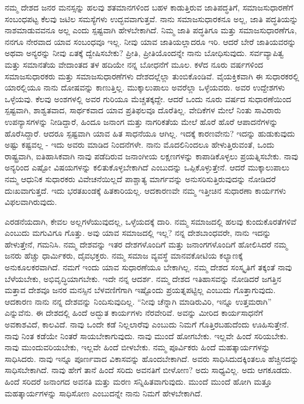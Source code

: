 ನಮ್ಮ ದೇಶದ ಜನರ ಮನಸ್ಸನ್ನು ಹಲವು ಶತಮಾನಗಳಿಂದ ಬಹಳ ಕಾಡುತ್ತಿರುವ ಜಾತಿಪದ್ಧತಿಗೆ, ಸಮಾಜಸುಧಾರಣೆಗೆ ಸಂಬಂಧಪಟ್ಟ ಕೆಲವು ಜಟಿಲ ಸಮಸ್ಯೆಗಳು ಉದ್ಭವವಾಗುತ್ತವೆ. ನಾನು ಸಮಾಜಸುಧಾರಕನೂ ಅಲ್ಲ, ಜಾತಿ ಪದ್ಧತಿಯನ್ನು ನಾಶಮಾಡುವವನೂ ಅಲ್ಲ ಎಂದು ಸ್ಪಷ್ಟವಾಗಿ ಹೇಳಬೇಕಾಗಿದೆ. ನಿಮ್ಮ ಜಾತಿ ಪದ್ಧತಿಗೂ ಮತ್ತು ಸಮಾಜಸುಧಾರಣೆಗೂ, ನನಗೂ ನೇರವಾದ ಯಾವ ಸಂಬಂಧವೂ ಇಲ್ಲ. ನೀವು ಯಾವ ಜಾತಿಯಲ್ಲಾದರೂ ಇರಿ. ಆದರೆ ಬೇರೆ ಜಾತಿಯವರನ್ನು ಅಥವಾ ಅನ್ಯರನ್ನು ನೀವು ಏತಕ್ಕೆ ದ್ವೇಷಿಸಬೇಕು? ಪ್ರೀತಿ, ಪ್ರೀತಿಯೊಂದನ್ನೇ ನಾನು ಬೋಧಿಸುವುದು. ಸರ್ವವ್ಯಾಪಿತ್ವ ಮತ್ತು ಸಮಾನತೆಯ ವೇದಾಂತದ ತಳ ಹದಿಯೇ ನನ್ನ ಬೋಧನೆಗೆ ಮೂಲ. ಕಳೆದ ನೂರು ವರ್ಷಗಳಿಂದ ಸಮಾಜಸುಧಾರಕರು ಮತ್ತು ಸಮಾಜಸುಧಾರಣೆಗಳು ದೇಶದಲ್ಲೆಲ್ಲಾ ತುಂಬಿಕೊಂಡಿವೆ. ವೈಯಕ್ತಿಕವಾಗಿ ಈ ಸುಧಾರಕರಲ್ಲಿ ಯಾರಲ್ಲಿಯೂ ನಾನು ದೋಷವನ್ನು ಕಾಣುತ್ತಿಲ್ಲ. ಮುಕ್ಕಾಲುಪಾಲು ಅವರೆಲ್ಲಾ ಒಳ್ಳೆಯವರು. ಅವರ ಉದ್ದೇಶಗಳು ಒಳ್ಳೆಯವು. ಕೆಲವು ಅಂಶಗಳಲ್ಲಿ ಅವರ ಗುರಿಯೂ ಮೆಚ್ಚತಕ್ಕದ್ದೇ. ಆದರೆ ಒಂದು ನೂರು ವರ್ಷದ ಸುಧಾರಣೆಯಿಂದ ಸ್ಪಷ್ಟವಾಗಿ, ಶಾಶ್ವತವಾದ, ಸಾರ್ಥಕವಾದ ಯಾವ ಪ್ರತಿಫಲವೂ ದೊರೆತಿಲ್ಲ. ವೇದಿಕೆಗಳ ಮೇಲೆ ನಿಂತು ಸಾವಿರಾರು ಉಪನ್ಯಾಸಗಳನ್ನು ನೀಡಿದ್ದಾರೆ, ಹಿಂದೂ ಜನಾಂಗ ಮತ್ತು ನಾಗರಿಕತೆಯ ಮೇಲೆ ಹೊರೆ ಹೊರೆ ಆಪಾದನೆಗಳನ್ನು ಹೊರೆಸಿದ್ದಾರೆ. ಆದರೂ ಸ್ಪಷ್ಟವಾಗಿ ಯಾವ ಹಿತ ಸಾಧನೆಯೂ ಆಗಿಲ್ಲ. ಇದಕ್ಕೆ ಕಾರಣವೇನು? ಇದನ್ನು ಹುಡುಕುವುದು ಅಷ್ಟು ಕಷ್ಟವಲ್ಲ - ಇದು ಅವರು ಮಾಡಿದ ನಿಂದನೆಗಳೇ. ನಾನು ಮೊದಲಿನಿಂದಲೂ ಹೇಳುತ್ತಿರುವಂತೆ, ಒಂದು ರಾಷ್ಟ್ರವಾಗಿ, ಐತಿ\-ಹಾಸಿಕವಾಗಿ ನಾವು ಪಡೆದಿರುವ ಜನಾಂಗೀಯ ಲಕ್ಷಣಗಳನ್ನು ಕಾಪಾಡಿಕೊಳ್ಳಲು ಪ್ರಯತ್ನಿಸಬೇಕು. ನಾವು ಅನ್ಯರಿಂದ ಎಷ್ಟೋ ವಿಷಯಗಳನ್ನು ಕಲಿತುಕೊಳ್ಳಬೇಕಾಗಿದೆ ಎಂಬುದನ್ನು ಒಪ್ಪಿಕೊಳ್ಳುತ್ತೇನೆ. ಆದರೆ ಮುಕ್ಕಾಲುಪಾಲು ನಮ್ಮ ಆಧುನಿಕ ಸುಧಾರಕರು ವಿವೇಚನೆಯಿಲ್ಲದೆ ಪಾಶ್ಚಾತ್ಯ ಮಾರ್ಗವನ್ನು ಅನುಸರಿಸುತ್ತಿರುವುದನ್ನು ನೋಡಿದರೆ ದುಃಖವಾಗುತ್ತದೆ. ಇದು ಭರತಖಂಡಕ್ಕೆ ಹಿತಕಾರಿಯಲ್ಲ. ಆದಕಾರಣವೇ ನಮ್ಮ ಇತ್ತೀಚಿನ ಸುಧಾರಣಾ ಕಾರ್ಯಗಳು ವಿಫಲವಾಗಿರುವುದು.

\vskip 3pt

ಎರಡನೆಯದಾಗಿ, ಕೇವಲ ಅಲ್ಲಗಳೆಯುವುದಲ್ಲ, ಒಳ್ಳೆಯದಕ್ಕೆ ದಾರಿ. ನಮ್ಮ ಸಮಾಜದಲ್ಲಿ ಹಲವು ಕುಂದುಕೊರತೆಗಳಿವೆ ಎಂಬುದು ಮಗುವಿಗೂ ಗೊತ್ತು. ಅವು ಯಾವ ಸಮಾಜದಲ್ಲಿ ಇಲ್ಲ? ನನ್ನ ದೇಶಬಾಂಧವರೇ, ನಾನು ಇದನ್ನು ಹೇಳುತ್ತೇನೆ, ಗಮನಿಸಿ. ನಮ್ಮ ದೇಶವನ್ನು ಇತರ ದೇಶಗಳೊಂದಿಗೆ ಮತ್ತು ಜನಾಂಗಗಳೊಂದಿಗೆ ಹೋಲಿಸಿದರೆ ನಮ್ಮ ಜನರು ಹೆಚ್ಚು ಧಾರ್ಮಿಕರು, ದೈವಭಕ್ತರು. ನಮ್ಮ ಸಮಾಜ ವ್ಯವಸ್ಥೆ ಮಾನವಕೋಟಿಯ ಕಲ್ಯಾಣಕ್ಕೆ ಅನುಕೂಲಕರವಾಗಿದೆ. ನಮಗೆ ಇಂದು ಯಾವ ಸುಧಾರಣೆಯೂ ಬೇಕಾಗಿಲ್ಲ. ನಮ್ಮ ದೇಶದ ಸಂಸ್ಕೃತಿಗೆ ತಕ್ಕಂತೆ ನಾವು ಬೆಳೆಯಬೇಕು, ಅಭಿವೃದ್ಧಿಯಾಗಬೇಕು. ಇದೇ ನನ್ನ ಆದರ್ಶ. ನಮ್ಮ ದೇಶದ ಇತಿಹಾಸವನ್ನು ನೋಡಿದರೆ ಜಗತ್ತಿನ ಮತ್ತಾವ ದೇಶವೂ ಜನರ ಮನಸ್ಸಿನ ಬೆಳವಣಿಗೆಗಾಗಿ ಇಷ್ಟೊಂದು ಪ್ರಯತ್ನಪಟ್ಟಿಲ್ಲ ಎಂಬುದು ಗೊತ್ತಾಗುವುದು. ಆದಕಾರಣ ನಾನು ನನ್ನ ದೇಶವನ್ನು ನಿಂದಿಸುವುದಿಲ್ಲ. “ನೀವು ಚೆನ್ನಾಗಿ ಮಾಡಿರುವಿರಿ, ಇನ್ನೂ ಉತ್ತಮರಾಗಿ” ಎನ್ನುವೆನು. ಈ ದೇಶದಲ್ಲಿ ಹಿಂದೆ ಅದ್ಭುತ ಕಾರ್ಯಗಳು ನೆರವೇರಿವೆ. ಅವನ್ನು ಮೀರಿದ ಕಾರ್ಯಸಾಧನೆಗೆ ಅವಕಾಶವಿದೆ, ಕಾಲವಿದೆ. ನಾವು ಒಂದೇ ಕಡೆ ನಿಲ್ಲಲಾರೆವು ಎಂಬುದು ನಿಮಗೆ ಗೊತ್ತಿರಬಹುದೆಂದು ಊಹಿಸುತ್ತೇನೆ. ನಾವು ನಿಂತ ಕಡೆಯೇ ನಿಂತರೆ ಸಾಯಬೇಕಾಗುವುದು. ನಾವು ಮುಂದೆ ಹೋಗಬೇಕು. ಇಲ್ಲವೇ ಹಿಂದೆ ಸರಿಯಬೇಕು. ನಾವು ಮುಂದುವರಿಯಬೇಕು, ಇಲ್ಲವೇ ಹಿಂದೆ ಬೀಳಬೇಕು. ನಮ್ಮ ಪೂರ್ವಿಕರು ಹಿಂದೆ ಮಹತ್ಕಾರ್ಯಗಳನ್ನು ಸಾಧಿಸಿದರು. ನಾವು ಇನ್ನೂ ಪೂರ್ಣವಾದ ವಿಕಾಸವನ್ನು ಹೊಂದಬೇಕಾಗಿದೆ. ಅವರು ಸಾಧಿಸಿದುದಕ್ಕಿಂತಲೂ ಹೆಚ್ಚಿನದನ್ನು ಸಾಧಿಸಬೇಕಾಗಿದೆ. ನಾವು ಹೇಗೆ ತಾನೆ ಹಿಂದೆ ಸರಿದು ಅವನತಿಗೆ ಬೀಳೋಣ? ಅದು ಸಾಧ್ಯವಿಲ್ಲ. ಅದು ಆಗಕೂಡದು. ಹಿಂದೆ ಸರಿದರೆ ಜನಾಂಗದ ಅವನತಿ ಮತ್ತು ಮರಣ ಸನ್ನಿಹಿತವಾಗುವುದು. ಮುಂದೆ ಮುಂದೆ ಹೋಗಿ ಮತ್ತೂ ಮಹತ್ಕಾರ್ಯಗಳನ್ನು ಸಾಧಿಸೋಣ ಎಂಬುದನ್ನೇ ನಾನು ನಿಮಗೆ ಹೇಳಬೇಕಾಗಿದೆ.


